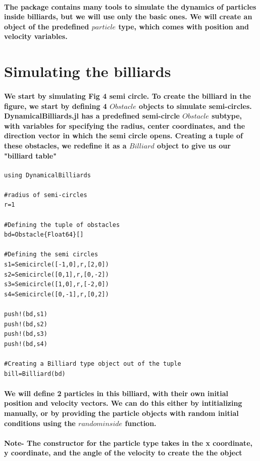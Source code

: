 \documentclass{report}
\begin{document}
\paragraph{The package contains many tools to simulate the dynamics of particles inside billiards, but we will use only the basic ones. We will create an object of the predefined $particle$ type, which comes with position and velocity variables.}


\section{Simulating the billiards}

\paragraph{We start by simulating Fig 4 semi circle. To create the billiard in the figure, we start by defining 4 $Obstacle$ objects to simulate semi-circles. DynamicalBilliards.jl has a predefined semi-circle $Obstacle$ subtype, with variables for specifying the radius, center coordinates, and the direction vector in which the semi circle opens. Creating a tuple of these obstacles, we redefine it as a $Billiard$ object to give us our "billiard table"  }

\begin{lstlisting}
using DynamicalBilliards

#radius of semi-circles
r=1 

#Defining the tuple of obstacles
bd=Obstacle{Float64}[]

#Defining the semi circles
s1=Semicircle([-1,0],r,[2,0])
s2=Semicircle([0,1],r,[0,-2])
s3=Semicircle([1,0],r,[-2,0])
s4=Semicircle([0,-1],r,[0,2])

push!(bd,s1)
push!(bd,s2)
push!(bd,s3)
push!(bd,s4)

#Creating a Billiard type object out of the tuple
bill=Billiard(bd)
\end{lstlisting}

\paragraph{We will define 2 particles in this billiard, with their own initial position and velocity vectors. We can do this either by intitializing manually, or by providing the particle objects with random initial conditions using the $randominside$ function.}

\paragraph{Note- The constructor for the particle type takes in the x coordinate, y coordinate, and the angle of the velocity to create the the object}
\end{document}
